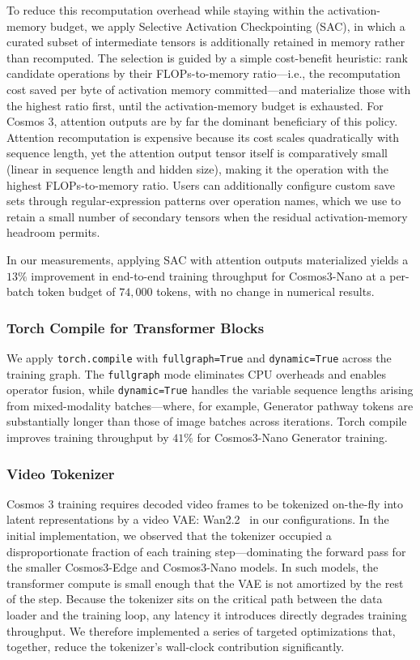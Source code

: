 \documentclass{llmxive}
\begin{document}
To reduce this recomputation overhead while staying within the activation-memory budget, we apply Selective Activation Checkpointing (SAC), in which a curated subset of intermediate tensors is additionally retained in memory rather than recomputed. The selection is guided by a simple cost-benefit heuristic: rank candidate operations by their FLOPs-to-memory ratio---i.e., the recomputation cost saved per byte of activation memory committed---and materialize those with the highest ratio first, until the activation-memory budget is exhausted. For Cosmos 3, attention outputs are by far the dominant beneficiary of this policy. Attention recomputation is expensive because its cost scales quadratically with sequence length, yet the attention output tensor itself is comparatively small (linear in sequence length and hidden size), making it the operation with the highest FLOPs-to-memory ratio. Users can additionally configure custom save sets through regular-expression patterns over operation names, which we use to retain a small number of secondary tensors when the residual activation-memory headroom permits.

In our measurements, applying SAC with attention outputs materialized yields a $13\%$ improvement in end-to-end training throughput for Cosmos3-Nano at a per-batch token budget of $74{,}000$ tokens, with no change in numerical results.

\subsubsection{Torch Compile for Transformer Blocks}

We apply \texttt{torch.compile} with \texttt{fullgraph=True} and \texttt{dynamic=True} across the training graph. The \texttt{fullgraph} mode eliminates CPU overheads and enables operator fusion, while \texttt{dynamic=True} handles the variable sequence lengths arising from mixed-modality batches---where, for example, Generator pathway tokens are substantially longer than those of image batches across iterations. Torch compile improves training throughput by $41\%$ for Cosmos3-Nano Generator training.

\subsubsection{Video Tokenizer}

Cosmos 3 training requires decoded video frames to be tokenized on-the-fly into latent representations by a video VAE: Wan2.2~\citep{wan2pt2} in our configurations. In the initial implementation, we observed that the tokenizer occupied a disproportionate fraction of each training step---dominating the forward pass for the smaller Cosmos3-Edge and Cosmos3-Nano models. In such models, the transformer compute is small enough that the VAE is not amortized by the rest of the step. Because the tokenizer sits on the critical path between the data loader and the training loop, any latency it introduces directly degrades training throughput. We therefore implemented a series of targeted optimizations that, together, reduce the tokenizer's wall-clock contribution significantly.
\end{document}
